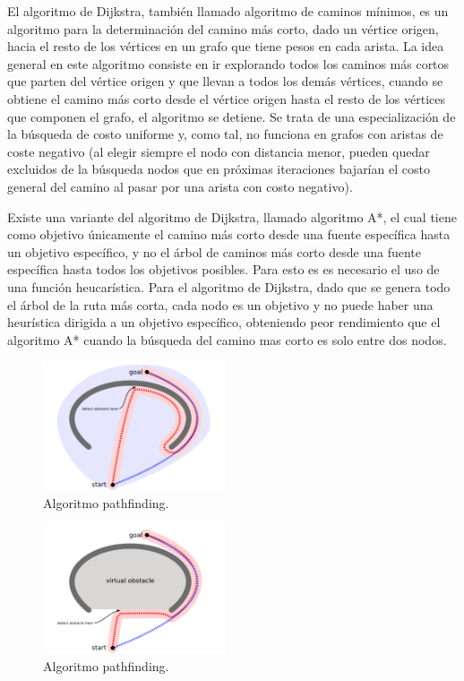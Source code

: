 \documentclass[reprint,amsmath,amssymb,aps]{revtex4-2}
\begin{document}
El algoritmo de Dijkstra, también llamado algoritmo de caminos mínimos, es un algoritmo para la determinación del camino más corto, dado un vértice origen, hacia el resto de los vértices en un grafo que tiene pesos en cada arista. La idea general en este algoritmo consiste en ir explorando todos los caminos más cortos que parten del vértice origen y que llevan a todos los demás vértices, cuando se obtiene el camino más corto desde el vértice origen hasta el resto de los vértices que componen el grafo, el algoritmo se detiene. Se trata de una especialización de la búsqueda de costo uniforme y, como tal, no funciona en grafos con aristas de coste negativo (al elegir siempre el nodo con distancia menor, pueden quedar excluidos de la búsqueda nodos que en próximas iteraciones bajarían el costo general del camino al pasar por una arista con costo negativo).

Existe una variante del algoritmo de Dijkstra, llamado algoritmo A*, el cual tiene como objetivo únicamente el camino más corto desde una fuente específica hasta un objetivo específico, y no el árbol de caminos más corto desde una fuente específica hasta todos los objetivos posibles. Para esto es es necesario el uso de una función heucarística. Para el algoritmo de Dijkstra, dado que se genera todo el árbol de la ruta más corta, cada nodo es un objetivo y no puede haber una heurística dirigida a un objetivo específico, obteniendo peor rendimiento que el algoritmo A* cuando la búsqueda del camino mas corto es solo entre dos nodos.

\begin{figure}[H]
 	\centering
 	\includegraphics[width=0.48\textwidth]{concave1.png}
 	\caption{Algoritmo pathfinding.}
 	\label{concave1}
\end{figure}
 
\begin{figure}[H]
 	\centering
 	\includegraphics[width=0.48\textwidth]{concave2.png}
 	\caption{Algoritmo pathfinding.}
 	\label{concave2}
\end{figure}
\end{document}
